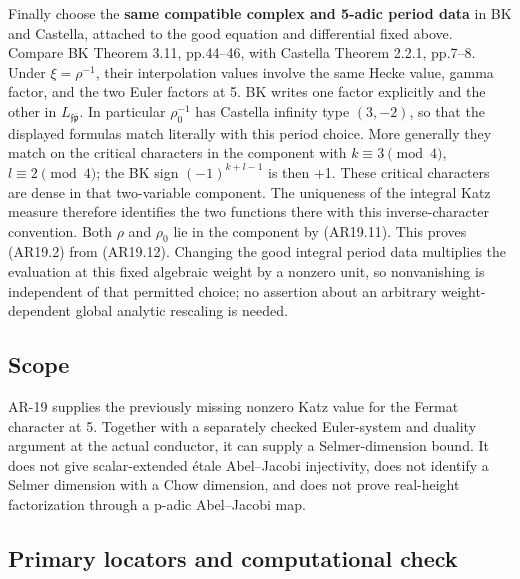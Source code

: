 \documentclass[11pt,a4paper]{article}
\begin{document}
Finally choose the \textbf{same compatible complex and 5-adic period
data} in BK and Castella, attached to the good equation and differential
fixed above. Compare BK Theorem 3.11, pp.44--46, with Castella Theorem
2.2.1, pp.7--8. Under \(\xi=\rho^{-1}\), their interpolation values
involve the same Hecke value, gamma factor, and the two Euler factors at
5. BK writes one factor explicitly and the other in
\(L_{\mathfrak f\bar{\mathfrak p}}\). In particular \(\rho_0^{-1}\) has
Castella infinity type \((3,-2)\), so that the displayed formulas match
literally with this period choice. More generally they match on the
critical characters in the component with \(k\equiv3\pmod4\),
\(l\equiv2\pmod4\); the BK sign \((-1)^{k+l-1}\) is then +1. These
critical characters are dense in that two-variable component. The
uniqueness of the integral Katz measure therefore identifies the two
functions there with this inverse-character convention. Both \(\rho\)
and \(\rho_0\) lie in the component by (AR19.11). This proves (AR19.2)
from (AR19.12). Changing the good integral period data multiplies the
evaluation at this fixed algebraic weight by a nonzero unit, so
nonvanishing is independent of that permitted choice; no assertion about
an arbitrary weight-dependent global analytic rescaling is needed.

\subsection{Scope}\label{scope}

AR-19 supplies the previously missing nonzero Katz value for the Fermat
character at 5. Together with a separately checked Euler-system and
duality argument at the actual conductor, it can supply a
Selmer-dimension bound. It does not give scalar-extended étale
Abel--Jacobi injectivity, does not identify a Selmer dimension with a
Chow dimension, and does not prove real-height factorization through a
p-adic Abel--Jacobi map.

\subsection{Primary locators and computational
check}\label{primary-locators-and-computational-check}
\end{document}
